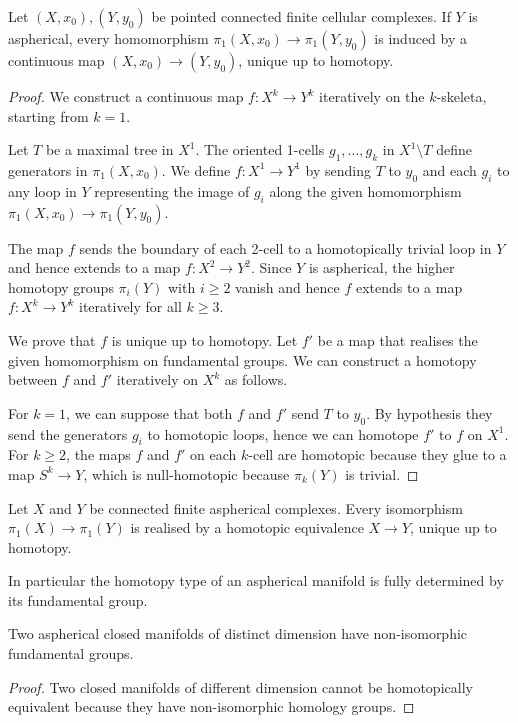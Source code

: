 \begin{teo} \label{complessi:omotopia:teo}
Let $(X,x_0), (Y,y_0)$ be pointed connected finite cellular complexes. If $Y$ is aspherical, every homomorphism $\pi_1(X,x_0) \to \pi_1(Y,y_0)$ is induced by a continuous map $(X,x_0)\to (Y,y_0)$, unique up to homotopy.
\end{teo}
\begin{proof}
We construct a continuous map $f\colon X^k \to Y^k$ iteratively on the $k$-skeleta, starting from $k=1$. 

Let $T$ be a maximal tree in $X^1$. The oriented 1-cells $g_1,\ldots, g_k$ in $X^1\setminus T$ define generators in $\pi_1(X,x_0)$. We define $f\colon X^1 \to Y^1$ by sending $T$ to $y_0$ and each $g_i$ to any loop in $Y$ representing the image of $g_i$ along the given homomorphism $\pi_1(X,x_0) \to \pi_1(Y,y_0)$.

The map $f$ sends the boundary of each 2-cell to a homotopically trivial loop in $Y$ and hence extends to a map $f\colon X^2 \to Y^2$. Since $Y$ is aspherical, the higher homotopy groups $\pi_i(Y)$ with $i\geqslant 2$ vanish and hence $f$ extends to a map $f\colon X^k \to Y^k$ iteratively for all $k\geqslant 3$.

We prove that $f$ is unique up to homotopy. Let $f'$ be a map that realises the given homomorphism on fundamental groups. We can construct a homotopy between $f$ and $f'$ iteratively on $X^k$ as follows. 

For $k=1$, we can suppose that both $f$ and $f'$ send $T$ to $y_0$. By hypothesis they send the generators $g_i$ to homotopic loops, hence we can homotope $f'$ to $f$ on $X^1$. For $k\geqslant 2$, the maps $f$ and $f'$ on each $k$-cell are homotopic because they glue to a map $S^k \to Y$, which is null-homotopic because $\pi_k(Y)$ is trivial.
\end{proof}

\begin{cor} \label{aspherical:cor}
Let $X$ and $Y$ be connected finite aspherical complexes. Every isomorphism $\pi_1(X) \to \pi_1(Y)$ is realised by a homotopic equivalence $X \to Y$, unique up to homotopy.
\end{cor}

In particular the homotopy type of an aspherical manifold is fully determined by its fundamental group.

\begin{cor}
Two aspherical closed manifolds of distinct dimension have non-isomorphic fundamental groups.
\end{cor}
\begin{proof}
Two closed manifolds of different dimension cannot be homotopically equivalent because they have non-isomorphic homology groups.
\end{proof}

